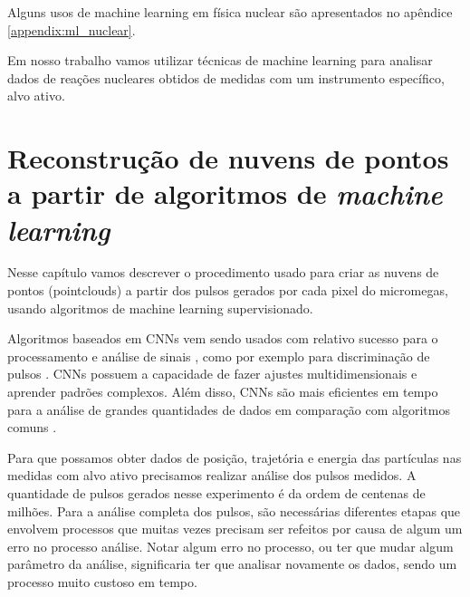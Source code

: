 \documentclass[a4paper,12pt,oneside]{book}
\begin{document}

\par Alguns usos de machine learning em física nuclear são apresentados no apêndice \ref{appendix:ml_nuclear}. 

\par Em nosso trabalho vamos utilizar técnicas de machine learning para analisar dados de reações nucleares obtidos de medidas com um instrumento específico, alvo ativo.


\chapter{Reconstrução de nuvens de pontos a partir de algoritmos de \textit{machine learning}}\label{chapter:sinais}

\par Nesse capítulo vamos descrever o procedimento usado para criar as nuvens de pontos (pointclouds) a partir dos pulsos gerados por cada pixel do micromegas, usando algoritmos de machine learning supervisionado.

\par Algoritmos baseados em CNNs vem sendo usados com relativo sucesso para o processamento e análise de sinais \cite{FORTINO2022166497}, como por exemplo para discriminação de pulsos \cite{Holl2019}. CNNs possuem a capacidade de fazer ajustes multidimensionais e aprender padrões complexos. Além disso, CNNs são mais eficientes em tempo para a análise de grandes quantidades de dados em comparação com algoritmos comuns \cite{FORTINO2022166497}.

\par Para que possamos obter dados de posição, trajetória e energia das partículas nas medidas com alvo ativo precisamos realizar análise dos pulsos medidos. A quantidade de pulsos gerados nesse experimento é da ordem de centenas de milhões. Para a análise completa dos pulsos, são necessárias diferentes etapas que envolvem processos que muitas vezes precisam ser refeitos por causa de algum um erro no processo análise. Notar algum erro no processo, ou ter que mudar algum parâmetro da análise, significaria ter que analisar novamente os dados, sendo um processo muito custoso em tempo.
\end{document}
